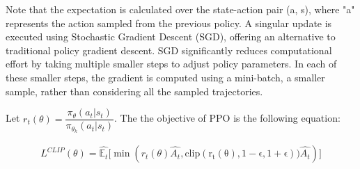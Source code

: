 \documentclass[conference]{IEEEtran}
\begin{document}


Note that the expectation is calculated over the state-action pair (a, s), where "a" represents the action sampled from the previous policy. A singular update is executed using Stochastic Gradient Descent (SGD), offering an alternative to traditional policy gradient descent. SGD significantly reduces computational effort by taking multiple smaller steps to adjust policy parameters. In each of these smaller steps, the gradient is computed using a mini-batch, a smaller sample, rather than considering all the sampled trajectories.

Let $r_t(\theta) = \dfrac{ \pi_{\theta}(a_t|s_t)} { \pi_{\theta_k}(a_t|s_t)}$. The the objective of PPO is the following equation:

\begin{strip}
  \begin{align}
    L^{CLIP}( \theta ) = \hat{ \mathbb{E}_{t} }     
                                            \Bigg[
                                                \min 
                                                (  
                                                  r_t(\theta)
                                                 \hat{A_t}
                                              ,
                                              \mathrm{
                                              clip(   
                                                    r_t(\theta)
                                               ,
                                               1 - \epsilon
                                               , 
                                               1 + \epsilon
                                                )
                                              }    
                                          \bigg)
                                           \hat{A_t}
                                            ) 
                                    \Bigg]
  \end{align}
\end{strip}
\end{document}
